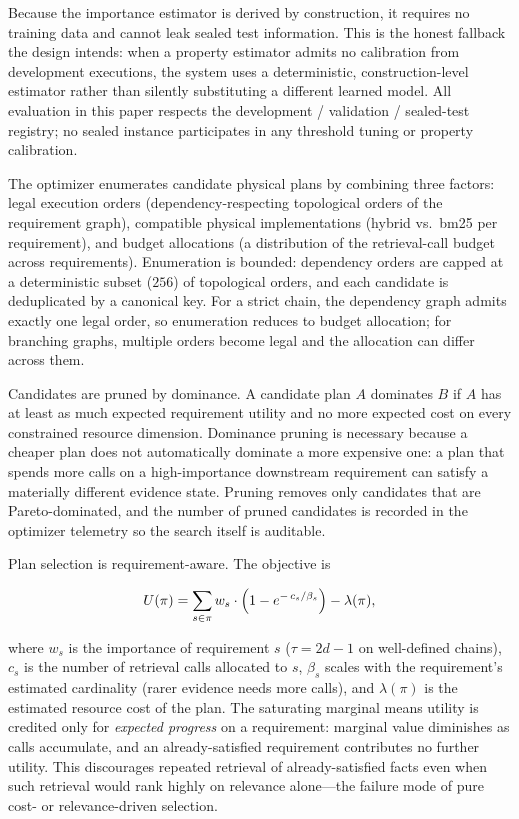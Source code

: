 Because the importance estimator is derived by construction, it requires no
training data and cannot leak sealed test information. This is the honest
fallback the design intends: when a property estimator admits no calibration
from development executions, the system uses a deterministic, construction-level
estimator rather than silently substituting a different learned model. All
evaluation in this paper respects the development / validation / sealed-test
registry; no sealed instance participates in any threshold tuning or property
calibration.

The optimizer enumerates candidate physical plans by combining three factors:
legal execution orders (dependency-respecting topological orders of the
requirement graph), compatible physical implementations (hybrid vs.\ bm25 per
requirement), and budget allocations (a distribution of the retrieval-call
budget across requirements). Enumeration is bounded: dependency orders are
capped at a deterministic subset ($256$) of topological orders, and each
candidate is deduplicated by a canonical key. For a strict chain, the
dependency graph admits exactly one legal order, so enumeration reduces to
budget allocation; for branching graphs, multiple orders become legal and the
allocation can differ across them.

Candidates are pruned by dominance. A candidate plan $A$ dominates $B$ if $A$
has at least as much expected requirement utility and no more expected cost on
every constrained resource dimension. Dominance pruning is necessary because a
cheaper plan does not automatically dominate a more expensive one: a plan that
spends more calls on a high-importance downstream requirement can satisfy a
materially different evidence state. Pruning removes only candidates that are
Pareto-dominated, and the number of pruned candidates is recorded in the
optimizer telemetry so the search itself is auditable.

Plan selection is requirement-aware. The objective is

\vspace{-0.1em}
\begin{equation}
\label{eq:objective}
U(\pi) = \sum_{s \in \pi} w_s \cdot \Bigl(1 - e^{-\,c_s / \beta_s}\Bigr) - \lambda(\pi),
\end{equation}
\vspace{-0.1em}

\noindent
where $w_s$ is the importance of requirement $s$ ($\tau = 2d-1$ on well-defined
chains), $c_s$ is the number of retrieval calls allocated to $s$, $\beta_s$
scales with the requirement's estimated cardinality (rarer evidence needs more
calls), and $\lambda(\pi)$ is the estimated resource cost of the plan. The
saturating marginal means utility is credited only for \emph{expected progress}
on a requirement: marginal value diminishes as calls accumulate, and an
already-satisfied requirement contributes no further utility. This discourages
repeated retrieval of already-satisfied facts even when such retrieval would
rank highly on relevance alone---the failure mode of pure cost- or
relevance-driven selection.

